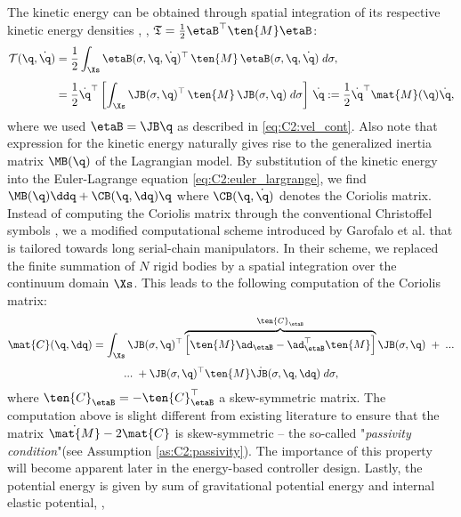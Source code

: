 The kinetic energy can be obtained through spatial integration of its respective kinetic energy densities \cite{Boyer2010,Mochiyama2003,Tatlicioglu2007}, \ie,
$\mathfrak{T} = \frac{1}{2}\etaB^\top \ten{M} \etaB
$:
%
\begin{align}
\mathcal{T}({\q},\dot{{\q}}) & = \frac{1}{2}\int_\Xs \etaB(\sigma,{\q},\dot{\q})^\top\,\ten{M}\,{\etaB}(\sigma,{\q},\dot{{\q}}) \; d \sigma,
 \notag \\[0.35em]
& =  \frac{1}{2} \dot{\q}^\top \left[\int_\Xs  \JB(\sigma,\q)^\top\,\ten{M}\, \JB(\sigma,\q) \; d \sigma \right]\, \dot{\q} := \frac{1}{2}\dot{\q}^\top \mat{M}(\q) \dot{\q},
\label{eq:C2:kinetic_energy}
\end{align}
%
%
where we used $\etaB = \JB \q$ as described in \eqref{eq:C2:vel_cont}. Also note that expression for the kinetic energy naturally gives rise to the generalized inertia matrix $\MB(\q)$ of the Lagrangian model. By substitution of the kinetic energy into the Euler-Lagrange equation \eqref{eq:C2:euler_largrange}, we find $\MB(\q)\ddq + \CB(\q,\dq)\q$ where $\CB(\q,\dot{\q})$ denotes the Coriolis matrix. \editl Instead of computing the Coriolis matrix through the conventional Christoffel symbols \cite{Murray1994}, we a modified computational scheme introduced by Garofalo et al. \cite{Garofalo2013} that is tailored towards long serial-chain manipulators. In their scheme, we replaced the finite summation of $N$ rigid bodies by a spatial integration over the continuum domain $\Xs$. This leads to the following computation of the Coriolis matrix: \editr
%
\begin{multline}
\mat{C}(\q,\dq) = \int_\Xs \JB(\sigma,\q)^\top \overbrace{\left[\ten{M} \ad_{\etaB}  - \ad_{\etaB} ^\top \ten{M} \right]}^{\ten{C}_{\etaB}} \JB(\sigma,\q)\; +\; ... \\[0.35em] ...\; + \JB(\sigma,\q)^\top \ten{M} \,\,\dot{\!\!\JB}(\sigma,\q,\dq) \; d \sigma,
\label{eq:C2:coriolis}
\end{multline}
%
where $\ten{C}_{\etaB} = -\ten{C}_{\etaB}^\top$ a skew-symmetric matrix. The computation above is slight different from existing literature \cite{Boyer2021,Renda2020} to ensure that the matrix $\dot{\mat{M}} - 2\mat{C}$ is skew-symmetric -- the so-called "\emph{passivity condition}"(see Assumption \ref{as:C2:passivity}). The importance of this property will become apparent later in the energy-based controller design. Lastly, the potential energy is given by sum of gravitational potential energy and internal elastic potential, \ie,
